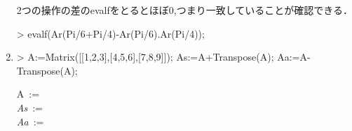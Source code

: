 \begin{enumerate}
2つの操作の差のevalfをとるとほぼ0,つまり一致していることが確認できる．
\begin{MapleInput}
> evalf(Ar(Pi/6+Pi/4)-Ar(Pi/6).Ar(Pi/4));
\end{MapleInput}
\begin{MapleOutput}
\left[ \begin {array}{cc} - 0.0000000002000000000& 0.0\\  0.0&- 0.0000000002000000000\end {array} \right]
\end{MapleOutput}

\item

\begin{MapleInput}
> A:=Matrix([[1,2,3],[4,5,6],[7,8,9]]); As:=A+Transpose(A); Aa:=A-Transpose(A);
\end{MapleInput}
\begin{MapleOutputGather}
A\, := \,  \notag \\
{\it As}\, := \,  \notag \\
{\it Aa}\, := \,  \notag 
\end{MapleOutputGather}
\end{enumerate}
